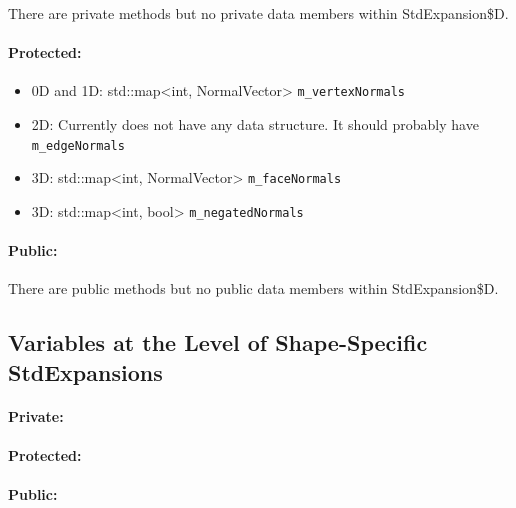 There are private methods but no private data members within StdExpansion\$D.

\paragraph{Protected:}


\begin{itemize}
\item 0D and 1D: std::map<int, NormalVector> \verb+m_vertexNormals+
%
\item 2D: Currently does not have any data structure.  It should probably have \verb+m_edgeNormals+
%
\item 3D: std::map<int, NormalVector> \verb+m_faceNormals+
%
\item 3D: std::map<int, bool> \verb+m_negatedNormals+
\end{itemize}

\paragraph{Public:}

There are public methods but no public data members within StdExpansion\$D.

\subsection{Variables at the Level of Shape-Specific StdExpansions}

\paragraph{Private:}

\paragraph{Protected:}

\paragraph{Public:}



